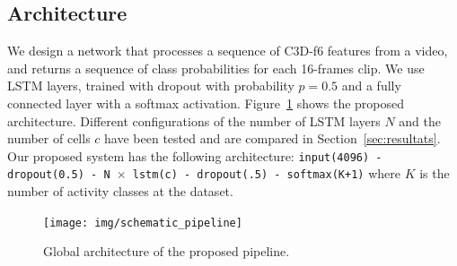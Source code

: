 \documentclass{article}
\begin{document}

\subsection{Architecture}
\label{sec:architecture}
We design a network that processes a sequence of C3D-f6 features from a video, and returns a sequence of class probabilities for each 16-frames clip.
We use LSTM layers, trained with dropout with probability $p = 0.5$ and a fully connected layer with a softmax activation. Figure~\ref{fig:global_pipeline} shows the proposed architecture.
Different configurations of the number of LSTM layers $N$ and the number of cells $c$ have been tested and are compared in Section~\ref{sec:resultats}.
Our proposed system has the following architecture: \texttt{input(4096) - dropout(0.5) - N $\times$ lstm(c) - dropout(.5) - softmax(K+1)} where $K$ is the number of activity classes at the dataset.

\begin{figure}[ht]
\centering
\texttt{[image: img/schematic\_pipeline]}
\caption{Global architecture of the proposed pipeline.}
\label{fig:global_pipeline}
\end{figure}


\end{document}
